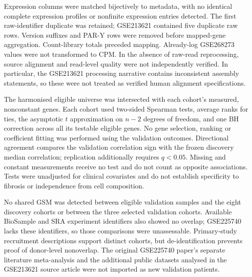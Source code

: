 \documentclass[10pt,a4paper]{article}
\begin{document}
Expression columns were matched bijectively to metadata, with no identical complete expression profiles or nonfinite expression entries detected. The first raw-identifier duplicate was retained; GSE213621 contained five duplicate raw rows. Version suffixes and PAR-Y rows were removed before mapped-gene aggregation. Count-library totals preceded mapping. Already-log GSE268273 values were not transformed to CPM. In the absence of raw-read reprocessing, source alignment and read-level quality were not independently verified. In particular, the GSE213621 processing narrative contains inconsistent assembly statements, so these were not treated as verified human alignment specifications.

The harmonised eligible universe was intersected with each cohort's measured, nonconstant genes. Each cohort used two-sided Spearman tests, average ranks for ties, the asymptotic $t$ approximation on $n-2$ degrees of freedom, and one BH correction across all its testable eligible genes. No gene selection, ranking or coefficient fitting was performed using the validation outcomes. Directional agreement compares the validation correlation sign with the frozen discovery median correlation; replication additionally requires $q<0.05$. Missing and constant measurements receive no test and do not count as opposite associations. Tests were unadjusted for clinical covariates and do not establish specificity to fibrosis or independence from cell composition.

No shared GSM was detected between eligible validation samples and the eight discovery cohorts or between the three selected validation cohorts. Available BioSample and SRA experiment identifiers also showed no overlap; GSE225740 lacks these identifiers, so those comparisons were unassessable. Primary-study recruitment descriptions support distinct cohorts, but de-identification prevents proof of donor-level nonoverlap. The original GSE225740 paper's separate literature meta-analysis and the additional public datasets analysed in the GSE213621 source article were not imported as new validation patients.
\end{document}
